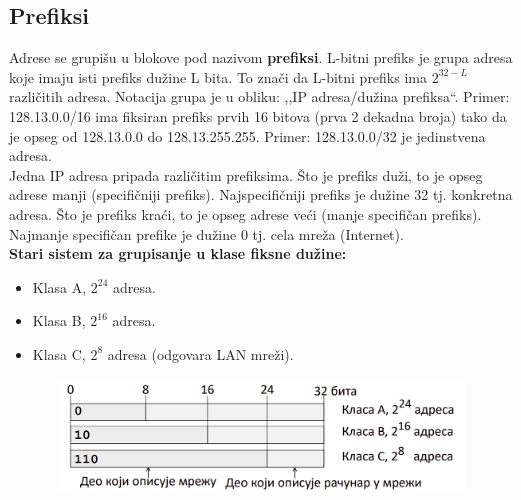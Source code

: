 \documentclass[a4paper]{article}
\begin{document}
    \subsection{Prefiksi}
        Adrese se grupišu u blokove pod nazivom \textbf{prefiksi}. L-bitni prefiks je grupa adresa
        koje imaju isti prefiks dužine L bita. To znači da L-bitni prefiks ima $2^{32-L}$ 
        različitih adresa. Notacija grupa je u obliku: ,,IP adresa/dužina prefiksa``. Primer:
        128.13.0.0/16 ima fiksiran prefiks prvih 16 bitova (prva 2 dekadna broja) tako da je
        opseg od 128.13.0.0 do 128.13.255.255. Primer: 128.13.0.0/32 je jedinstvena adresa. \\
        \indent Jedna IP adresa pripada različitim prefiksima. Što je prefiks duži, to je 
        opseg adrese manji (specifičniji prefiks). Najspecifičniji prefiks je dužine 32 tj.
        konkretna adresa. Što je prefiks kraći, to je opseg adrese veći (manje specifičan prefiks).
        Najmanje specifičan prefike je dužine 0 tj. cela mreža (Internet).\\

        \textbf{Stari sistem za grupisanje u klase fiksne dužine:}
        \begin{itemize}
            \item Klasa A, $2^{24}$ adresa.
            \item Klasa B, $2^{16}$ adresa.
            \item Klasa C, $2^{8}$ adresa (odgovara LAN mreži).
        \end{itemize}
        \begin{figure}[H]
            \begin{center}
                \includegraphics[width=120mm,height=30mm]{Slike/ip_prefiksi_stara_klasifikacija.png}
            \end{center}
        \end{figure}
\end{document}
